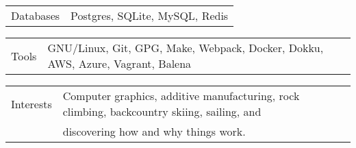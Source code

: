 \documentclass[10pt,notitlepage,oneside,draft]{article}
\begin{document}
\begin{flushleft}
  \vspace{6pt}

  \begin{tabular}{p{78pt} | l}
    \scriptsize Databases & Postgres, SQLite, MySQL, Redis \\
  \end{tabular}

  \vspace{6pt}

  \begin{tabular}{p{78pt} | l}
    \scriptsize Tools & GNU/Linux, Git, GPG, Make, Webpack, Docker, Dokku, AWS, Azure, Vagrant, Balena
  \end{tabular}

  \vspace{6pt}

  \begin{tabular}{p{78pt} | l}
    \scriptsize Interests & Computer graphics, additive manufacturing, rock climbing, backcountry skiing, sailing, and \\
    & discovering how and why things work.
  \end{tabular}

  \vspace{16pt}

\end{flushleft}
\end{document}
